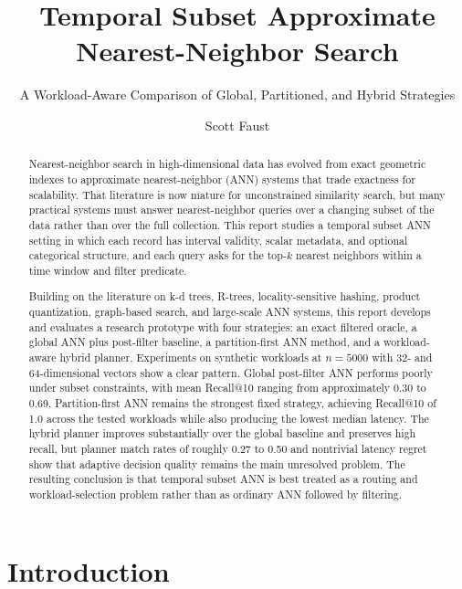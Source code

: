 \documentclass[sigconf,nonacm]{acmart}
\title{Temporal Subset Approximate Nearest-Neighbor Search}
\subtitle{A Workload-Aware Comparison of Global, Partitioned, and Hybrid Strategies}
\author{Scott Faust}
\affiliation{
  \institution{University of Nebraska Omaha}
  \city{Omaha}
  \state{Nebraska}
  \country{USA}
}
\begin{document}
\begin{abstract}
Nearest-neighbor search in high-dimensional data has evolved from exact geometric indexes to approximate nearest-neighbor (ANN) systems that trade exactness for scalability. That literature is now mature for unconstrained similarity search, but many practical systems must answer nearest-neighbor queries over a changing subset of the data rather than over the full collection. This report studies a temporal subset ANN setting in which each record has interval validity, scalar metadata, and optional categorical structure, and each query asks for the top-$k$ nearest neighbors within a time window and filter predicate.

Building on the literature on k-d trees, R-trees, locality-sensitive hashing, product quantization, graph-based search, and large-scale ANN systems, this report develops and evaluates a research prototype with four strategies: an exact filtered oracle, a global ANN plus post-filter baseline, a partition-first ANN method, and a workload-aware hybrid planner. Experiments on synthetic workloads at $n=5000$ with 32- and 64-dimensional vectors show a clear pattern. Global post-filter ANN performs poorly under subset constraints, with mean Recall@10 ranging from approximately 0.30 to 0.69. Partition-first ANN remains the strongest fixed strategy, achieving Recall@10 of 1.0 across the tested workloads while also producing the lowest median latency. The hybrid planner improves substantially over the global baseline and preserves high recall, but planner match rates of roughly 0.27 to 0.50 and nontrivial latency regret show that adaptive decision quality remains the main unresolved problem. The resulting conclusion is that temporal subset ANN is best treated as a routing and workload-selection problem rather than as ordinary ANN followed by filtering.
\end{abstract}


\maketitle

\section{Introduction}
\end{document}
